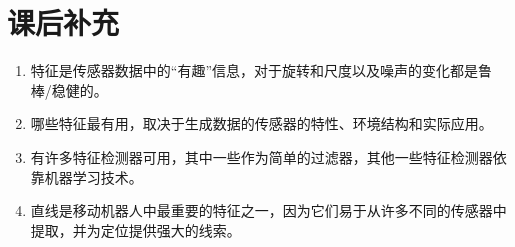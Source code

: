 \section*{课后补充}
\begin{enumerate}

\item 特征是传感器数据中的“有趣”信息，对于旋转和尺度以及噪声的变化都是鲁棒/稳健的。
\item 哪些特征最有用，取决于生成数据的传感器的特性、环境结构和实际应用。
\item 有许多特征检测器可用，其中一些作为简单的过滤器，其他一些特征检测器依靠机器学习技术。
\item 直线是移动机器人中最重要的特征之一，因为它们易于从许多不同的传感器中提取，并为定位提供强大的线索。
\end{enumerate}

